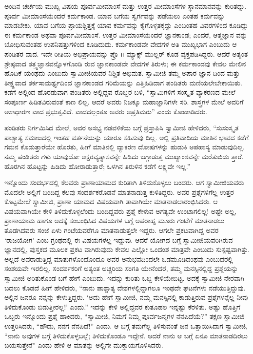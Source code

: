 ಅಂದಿನ ಚರ್ಚೆಯ ಮುಖ್ಯ ವಿಷಯ ಪೂರ್ವಮೀಮಾಂಸೆ ಮತ್ತು ಉತ್ತರ ಮೀಮಾಂಸೆಗಳ ಸ್ಥಾನಮಾನವನ್ನು ಕುರಿತದ್ದು. ಪೂರ್ವ ಮೀಮಾಂಸೆಯೆಂದರೆ ಕರ್ಮಕಾಂಡ. ಯಾವ ಬಗೆಯ ಸ್ವರ್ಗವನ್ನು ಪಡೆಯಲು ಎಂತಹ ಕರ್ಮವನ್ನು ಮಾಡಬೇಕು, ಯಾವ ಬಗೆಯ ಪ್ರಾಯಶ್ಚಿತ್ತಕ್ಕೆ ಯಾವ ಕರ್ಮವನ್ನು ಕೈಗೊಳ್ಳತಕ್ಕದ್ದು ಎಂಬಂತಹ ವಿವರಗಳಿಂದ ಕೂಡಿದ್ದು ಈ ಕರ್ಮಕಾಂಡ ಅಥವಾ ಪೂರ್ವಮೀಮಾಂಸೆ. ಉತ್ತರ ಮೀಮಾಂಸೆಯೆಂದರೆ ಜ್ಞಾನಕಾಂಡ; ಎಂದರೆ, ಆತ್ಮಜ್ಞಾನ ವನ್ನು ಬೋಧಿಸುವಂತಹ ಉಪನಿಷತ್ತುಗಳಿಂದ ಕೂಡಿದುದು. ಕರ್ಮಕಾಂಡವೇ ವೇದಗಳ ಅತಿ ಮುಖ್ಯಭಾಗ ಎಂಬುದು ಆ ಪಂಡಿತರ ವಾದ. ಇದೇ ರೀತಿಯ ಅಭಿಪ್ರಾಯವನ್ನು ಪ್ರೊ ॥ ಮ್ಯಾಕ್ಸ್ ಮುಲ್ಲರ್ ಕೂಡ ವ್ಯಕ್ತಪಡಿಸಿದ್ದರು. ಆದರೆ ಅತ್ಯಂತ ಶ್ರೇಷ್ಠವಾದ ತತ್ತ್ವಜ್ಞಾನವನ್ನೊಳಗೊಂಡಿ ರುವ ಜ್ಞಾನಕಾಂಡವೇ ವೇದಗಳ ತಿರುಳು; ಈ ಕರ್ಮಕಾಂಡವು ಕೇವಲ ಮೇಲಿನ ಹೊದಿಕೆ ಯಂಥದು ಎಂಬುದು ಸ್ವಾಮೀಜಿಯವರ ನಿಶ್ಚಿತ ಅಭಿಮತ. ಸ್ವಾಮೀಜಿ ತಮ್ಮ ಅಪಾರ ಜ್ಞಾನ ದಿಂದ ಮತ್ತು ತೀಕ್ಷ್ಣವಾದ ತರ್ಕಸಾಮರ್ಥ್ಯದಿಂದ ಜ್ಞಾನಕಾಂಡದ ಗರಿಮೆಯನ್ನು ಎತ್ತಿಹಿಡಿದಾಗ ಪಂಡಿತರು ಮಣಿಯಲೇಬೇಕಾಯಿತು. ಕಡೆಗೆ ಅಲ್ಲಿಂದ ಹೊರಡುವಾಗ ಪಂಡಿತರು ಅಲ್ಲಿದ್ದವ ರೊಬ್ಬರ ಬಳಿ, “ಸ್ವಾಮಿಗಳಿಗೆ ಸಂಸ್ಕೃತ ವ್ಯಾಕರಣದ ಮೇಲೆ ಸಂಪೂರ್ಣ ಹಿಡಿತವಿರುವಂತೆ ಕಾಣ ಲಿಲ್ಲ. ಆದರೆ ಅವರು ನಿಜಕ್ಕೂ ಮಹಾಜ್ಞಾನಿಗಳೇ ಸರಿ. ಶಾಸ್ತ್ರಗಳ ಮೇಲೆ ಅವರಿಗೆ ಅಸಾಧಾರಣ ವಾದ ಪ್ರಭುತ್ವವಿದೆ. ವಾದದಲ್ಲಂತೂ ಅವರು ಅಪ್ರತಿಮರು” ಎಂದು ಕೊಂಡಾಡಿದರು.

ಪಂಡಿತರು ನಿರ್ಗಮಿಸಿದ ಮೇಲೆ, ಅವರ ಅಸಭ್ಯ ನಡವಳಿಕೆಯ ಬಗ್ಗೆ ಪ್ರಸ್ತಾಪಿಸಿ ಸ್ವಾಮೀಜಿ ಹೇಳಿದರು, “ಸುಸಂಸ್ಕೃತ ಪಾಶ್ಚಾತ್ಯ ಸಮಾಜದಲ್ಲಿ ಇಂತಹ ವರ್ತನೆಯನ್ನು ಯಾರೂ ಸಹಿಸುವು ದಿಲ್ಲ. ಅಲ್ಲಿ ಪ್ರತಿವಾದಿಯ ಮಾತಿನ ಭಾವದ ಕಡೆಗೆ ಗಮನ ಕೊಡುತ್ತಾರೆಯೇ ಹೊರತು, ಹೀಗೆ ಮಾತಿನಲ್ಲಿ ವ್ಯಾಕರಣ ದೋಷಗಳನ್ನು ಹುಡುಕಿ ಅಪಹಾಸ್ಯ ಮಾಡುವುದಿಲ್ಲ. ನಮ್ಮ ಪಂಡಿತರು ಗಳು ಯಾವುದೋ ಅಕ್ಷರವ್ಯತ್ಯಾಸವನ್ನೇ ಹಿಡಿದು ಜಗ್ಗಾಡುತ್ತ ಮುಖ್ಯಾಂಶವನ್ನೇ ಮರೆತುಬಿಡು ತ್ತಾರೆ. ಹೊರಗಿನ ಹೊಟ್ಟನ್ನು ಹಿಡಿದು ಹೋರಾಡುತ್ತಾರೆ; ಒಳಗಿನ ತಿರುಳಿನ ಕಡೆಗೆ ಲಕ್ಷ್ಯವೇ ಇಲ್ಲ.”

ಇನ್ನೊಂದು ಸಂದರ್ಭದಲ್ಲಿ ಕೆಲವರು ಪ್ರಾಣಾಯಾಮದ ಕುರಿತಾಗಿ ತಿಳಿದುಕೊಳ್ಳಲು ಬಂದರು. ಆಗ ಸ್ವಾಮೀಜಿಯವರು ಮೊದಲೇ ಅಲ್ಲಿಗೆ ಬಂದಿದ್ದ ಕೆಲವು ಸಂದರ್ಶಕರೊಡನೆ ಮಾತನಾಡುತ್ತ ಕುಳಿತಿದ್ದರು. ಅವರ ಪ್ರಶ್ನೆಗಳಿಗೆಲ್ಲ ಉತ್ತರ ಕೊಟ್ಟಮೇಲೆ ಸ್ವಾಮೀಜಿ, ಪ್ರಾಣಾ ಯಾಮದ ವಿಷಯವಾಗಿ ತಾವಾಗಿಯೇ ಮಾತನಾಡಲಾರಂಭಿಸಿದರು. ಆ ವಿಷಯವಾಗಿಯೇ ಕೇಳಿ ತಿಳಿದುಕೊಳ್ಳಲೆಂದು ಬಂದಿದ್ದವರು ಪ್ರಶ್ನೆ ಕೇಳುವ ಅಗತ್ಯವೇ ಉಂಟಾಗಲಿಲ್ಲ! ಅಷ್ಟೇ ಅಲ್ಲ, ಪ್ರಾಣಾಯಾಮ ಹಾಗೂ ಅದಕ್ಕೆ ಸಂಬಂಧಿಸಿದ ವಿಷಯಗಳ ಬಗ್ಗೆ ಅಪರಾಹ್ನ ಮೂರು ಗಂಟೆಗೆ ಮಾತನಾಡಲು ತೊಡಗಿದವರು ಸಂಜೆ ಏಳು ಗಂಟೆಯವರೆಗೂ ಮಾತನಾಡುತ್ತಲೇ ಇದ್ದರು. ಆಗಲೇ ಪ್ರಕಟವಾಗಿದ್ದ ಅವರ ‘ರಾಜಯೋಗ’ ಎಂಬ ಗ್ರಂಥದಲ್ಲಿ ಈ ವಿಷಯಗಳೆಲ್ಲ ಇದ್ದುವು. ಆದರೆ ಯೋಗದ ಬಗ್ಗೆ ಸ್ವಾಮೀಜಿಯವರಿಗಿರುವ ಜ್ಞಾನದಲ್ಲಿ, ಪುಸ್ತಕದ ಮೂಲಕ ಪ್ರಕಟ ವಾಗಿರುವುದು ಕೇವಲ ಎಲ್ಲೋ ಒಂದಂಶ ಮಾತ್ರವೇ ಎಂಬುದು ಸುಸ್ಪಷ್ಟವಾಗಿತ್ತು. ಅಲ್ಲದೆ ಅವರಾಡುತ್ತಿದ್ದ ಮಾತುಗಳೊಂದೊಂದೂ ಅವರ ಅನುಭವದಿಂದಲೇ ಒಡಮೂಡಿದಂಥವು ಎಂಬುದರಲ್ಲಿ ಸಂಶಯವೇ ಇರಲಿಲ್ಲ. ಸಂದರ್ಶಕರಿಗೆ ಅತ್ಯಂತ ಅಚ್ಚರಿಯ ಸಂಗತಿ ಯೇನೆಂದರೆ, ತಮ್ಮ ಮನಸ್ಸಿನಲ್ಲಿದ್ದ ಪ್ರಶ್ನೆಯನ್ನು ಸ್ವಾಮೀಜಿ ಅರಿತುಕೊಂಡ ಬಗೆ ಹೇಗೆ ಎಂಬುದು. ಇದನ್ನು ಕುರಿತು ಒಬ್ಬ ಕೇಳಿಯೇಬಿಟ್ಟ. ಅದಕ್ಕೆ ಸ್ವಾಮೀಜಿ ನೇರವಾಗಿ ಬದಲು ಕೊಡದೆ ಹೀಗೆ ಹೇಳಿದರು, “ನಾನು ಪಾಶ್ಚಾತ್ಯ ದೇಶಗಳಲ್ಲಿದ್ದಾಗಲೂ ಇಂಥದೇ ಘಟನೆಗಳು ನಡೆಯುತ್ತಿದ್ದುವು. ಅಲ್ಲಿನ ಜನರೂ ನನ್ನನ್ನು ಕೇಳುತ್ತಿದ್ದರು. ‘ಅದು ಹೇಗೆ ಸ್ವಾಮೀಜಿ, ನಮ್ಮ ಮನಸ್ಸಿನಲ್ಲಿ ಕಾಡುತ್ತಿರುವ ಪ್ರಶ್ನೆಗಳನ್ನೆಲ್ಲ ನೀವು ತಿಳಿದುಕೊಂಡು ಬಿಡುತ್ತೀರಲ್ಲ!’ ಎಂದು.” ಇದನ್ನು ಕೇಳಿ ಅಲ್ಲಿದ್ದವರ ಕುತೂಹಲ ಇನ್ನಷ್ಟು ಕೆರಳಿತು. ಅಷ್ಟು ಹೊತ್ತಿಗೆ ಒಬ್ಬರು ಇನ್ನೊಂದು ಪ್ರಶ್ನೆ ಹಾಕಿದರು, “ಸ್ವಾಮೀಜಿ, ನಿಮಗೆ ನಿಮ್ಮ ಪೂರ್ವಜನ್ಮಗಳ ನೆನಪಿದೆಯೆ?” ತಕ್ಷಣ ಸ್ವಾಮೀಜಿ ಉತ್ತರಿಸಿದರು, “ಹೌದು, ನನಗೆ ನೆನಪಿದೆ!” ಎಂದು. ಆ ಬಗ್ಗೆ ತಮಗೆಲ್ಲ ತಿಳಿಸುವಂತೆ ಜನ ಒತ್ತಾಯಿಸಿದಾಗ ಸ್ವಾಮೀಜಿ, “ನಾನು ಅವುಗಳ ಬಗ್ಗೆ ತಿಳಿದುಕೊಳ್ಳಬಲ್ಲೆ; ತಿಳಿದುಕೊಂಡೂ ಇದ್ದೇನೆ. ಆದರೆ ನಾನು ಆ ಬಗ್ಗೆ ಏನೂ ಮಾತನಾಡದಿರಲು ಬಯಸುತ್ತೇನೆ” ಎಂದು ಹೇಳಿ ಆ ಮಾತನ್ನು ಅಲ್ಲಿಗೇ ಮುಕ್ತಾಯಗೊಳಿಸಿದರು.

